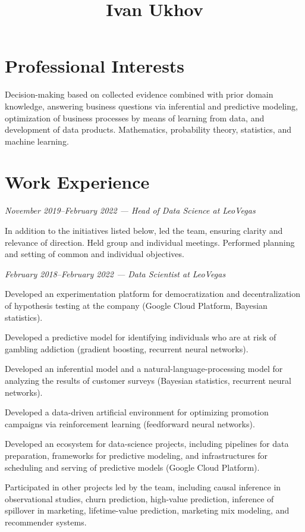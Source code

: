 \documentclass{article}
\title{Ivan Ukhov}
\begin{document}
\maketitle

\section{Professional Interests}
Decision-making based on collected evidence combined with prior domain
knowledge, answering business questions via inferential and predictive modeling,
optimization of business processes by means of learning from data, and
development of data products. Mathematics, probability theory, statistics, and
machine learning.

\section{Work Experience}
\emph{November 2019--February 2022 --- Head of Data Science at LeoVegas}

In addition to the initiatives listed below, led the team, ensuring clarity and
relevance of direction. Held group and individual meetings. Performed planning
and setting of common and individual objectives.

\emph{February 2018--February 2022 --- Data Scientist at LeoVegas}

Developed an experimentation platform for democratization and decentralization
of hypothesis testing at the company (Google Cloud Platform, Bayesian
statistics).

Developed a predictive model for identifying individuals who are at risk of
gambling addiction (gradient boosting, recurrent neural networks).

Developed an inferential model and a natural-language-processing model for
analyzing the results of customer surveys (Bayesian statistics, recurrent neural
networks).

Developed a data-driven artificial environment for optimizing promotion
campaigns via reinforcement learning (feedforward neural networks).

Developed an ecosystem for data-science projects, including pipelines for data
preparation, frameworks for predictive modeling, and infrastructures for
scheduling and serving of predictive models (Google Cloud Platform).

Participated in other projects led by the team, including causal inference in
observational studies, churn prediction, high-value prediction, inference of
spillover in marketing, lifetime-value prediction, marketing mix modeling, and
recommender systems.
\end{document}
